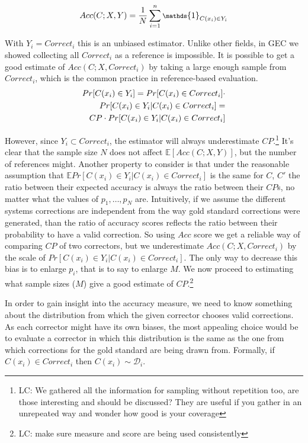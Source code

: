 \documentclass[letter,11pt]{article}
\newcommand{\lc}[1]{\footnote{\color{green}LC: #1}}
\begin{document}
		\begin{equation}
		\footnotesize
		Acc(C;X,Y) = \frac{1}{N} \sum_{i=1}^n \mathds{1}_{C(x_i) \in Y_i}
		\end{equation}
		
		With $Y_i=Correct_i$ this is an unbiased estimator. Unlike other fields, in GEC we showed collecting all $Correct_i$ as a reference is impossible. It is possible to get a good estimate of $Acc(C;X,Correct_i)$
		by taking a large enough sample from $Correct_i$, which is the common practice in reference-based evaluation.
		\begin{align}\label{eq:correction-in-gs}
		\footnotesize
		Pr[C(x_i) \in Y_i] = Pr[C(x_i) \in Correct_i] \cdot \\
		Pr[C(x_i) \in Y_i | C(x_i) \in Correct_i] = \nonumber \\
		CP\cdot Pr[C(x_i) \in Y_i | C(x_i) \in Correct_i]\nonumber
		\end{align}
		
		However, since $Y_i \subset Correct_i$, the estimator will always underestimate $CP$.\lc{We gathered all the information for sampling without repetition too, are those interesting and should be discussed? They are useful if you gather in an unrepeated way and wonder how good is your coverage }
		It's clear that the sample size $N$ does not affect $\mathbb{E}[Acc(C;X,Y)]$, but the number of references
		might. Another property to consider is that under the reasonable assumption that $\mathbb{E}Pr[C(x_i) \in Y_i | C(x_i) \in Correct_i]$ is the same for $C$, $C'$ the ratio between their expected accuracy
		is always the ratio between their $CP$s, no matter what the values of $p_1,\ldots,p_N$ are. Intuitively, if we assume the different systems corrections are independent from the way gold standard corrections were generated, than the ratio of accuracy scores reflects the ratio between their probability to have a valid correction.
		So using $Acc$ score we get a reliable way of comparing $CP$ of two correctors,
		but we underestimate $Acc\left(C;X,Correct_i\right)$ by the scale of $Pr\left[C\left(x_i\right) \in Y_i | C\left(x_i\right) \in Correct_i\right]$. The only way to decrease this bias
		is to enlarge $p_i$, that is to say to enlarge $M$. 
		We now proceed to estimating what sample sizes ($M$) give a good estimate of $CP$.\lc{make sure measure and score are being used consistently}
		
		In order to gain insight into the accuracy measure, we need to know something about the distribution from which the given corrector chooses valid corrections. As each corrector might have its own biases, the most appealing choice would be to evaluate a corrector in which this distribution is the same as the one from which corrections for the gold standard are being drawn from. Formally, if $C\left(x_i\right) \in Correct_i$ then $C\left(x_i\right) \sim \mathcal{D}_i$. 
		
\end{document}
